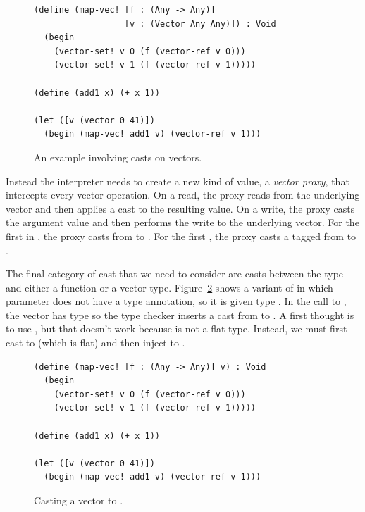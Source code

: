 \documentclass[11pt]{book}
\begin{document}
\begin{figure}[tbp]
\begin{lstlisting}
(define (map-vec! [f : (Any -> Any)]
                  [v : (Vector Any Any)]) : Void
  (begin
    (vector-set! v 0 (f (vector-ref v 0)))
    (vector-set! v 1 (f (vector-ref v 1)))))

(define (add1 x) (+ x 1))

(let ([v (vector 0 41)])
  (begin (map-vec! add1 v) (vector-ref v 1)))
\end{lstlisting}
\caption{An example involving casts on vectors.}
\label{fig:map-vec-bang}
\end{figure}

Instead the interpreter needs to create a new kind of value, a
\emph{vector proxy}, that intercepts every vector operation. On a
read, the proxy reads from the underlying vector and then applies a
cast to the resulting value.  On a write, the proxy casts the argument
value and then performs the write to the underlying vector. For the
first  in , the proxy casts
 from  to .  For the first
, the proxy casts a tagged  from 
to .

The final category of cast that we need to consider are casts between
the  type and either a function or a vector
type. Figure~\ref{fig:map-vec-any} shows a variant of 
in which parameter  does not have a type annotation, so it is
given type . In the call to , the vector has
type  so the type checker inserts a
cast from  to . A first
thought is to use , but that doesn't work because
 is not a flat type. Instead, we must
first cast to  (which is flat) and then inject
to .

\begin{figure}[tbp]
\begin{lstlisting}
(define (map-vec! [f : (Any -> Any)] v) : Void
  (begin
    (vector-set! v 0 (f (vector-ref v 0)))
    (vector-set! v 1 (f (vector-ref v 1)))))

(define (add1 x) (+ x 1))

(let ([v (vector 0 41)])
  (begin (map-vec! add1 v) (vector-ref v 1)))
\end{lstlisting}
\caption{Casting a vector to .}
\label{fig:map-vec-any}
\end{figure}
\end{document}
